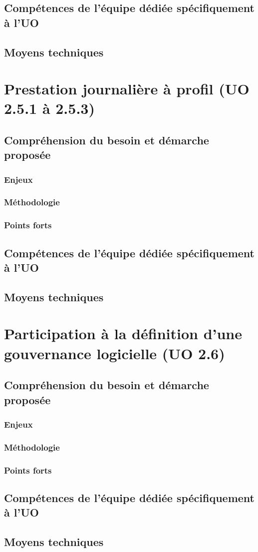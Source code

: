 	\subsection{Compétences de l'équipe dédiée spécifiquement à l'UO}	
	\subsection{Moyens techniques}
	
	\section{Prestation journalière à profil (UO 2.5.1 à 2.5.3)}
		\subsection{Compréhension du besoin et démarche proposée}
		\subsubsection{Enjeux}
		\subsubsection{Méthodologie}
		\subsubsection{Points forts}
		\subsection{Compétences de l'équipe dédiée spécifiquement à l'UO}	
		\subsection{Moyens techniques}
		
	\section{Participation à la définition d’une gouvernance logicielle (UO 2.6)}
	\subsection{Compréhension du besoin et démarche proposée}
	\subsubsection{Enjeux}
	\subsubsection{Méthodologie}
	\subsubsection{Points forts}
	\subsection{Compétences de l'équipe dédiée spécifiquement à l'UO}	
	\subsection{Moyens techniques}	